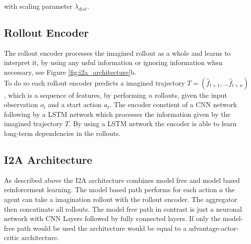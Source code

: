 with scaling parameter $\lambda_{dist}$.


 
\subsection{Rollout Encoder}
 

The rollout encoder processes the imagined rollout as a whole and learns to interpret it, by using any usful information or ignoring information when necessary, see Figure \ref{fig:i2a_architecture}b.\\

To do so each rollout encoder predicts a imagined trajectory $T = (\hat{f}_{t+1}, ... \hat{f}_{t+n})$, which is a sequence of features, by performing $n$ rollouts, given the input observation $o_t$ and a start action $a_t$.
The encoder constient of a CNN network following by a LSTM network which processes the information given by the imagined trajectory $T$. By using a LSTM network the encoder is able to learn long-term dependencies in the rollouts.

 
   
 
\subsection{I2A Architecture}


As described above the I2A architecture combines model free and model based reinforcement learning.
The model based path performs for each action $a$ the agent can take a imagination rollout with the rollout encoder.
The aggregator then concatinate all rollouts.
The model free path in contrast is just a neuronal network with CNN Layers followed by fully connected layers.
If only the model-free path would be used the architecture would be equal to a advantage-actor-critic architecture.\\
 

